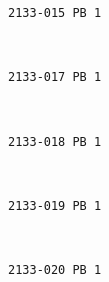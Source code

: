 \documentclass[11pt]{article}
\begin{document}
    \begin{Verbatim}[commandchars=\\\{\}]
2133-015 PB 1

    \end{Verbatim}

    \begin{center}
    \end{center}
    { \hspace*{\fill} \\}
    
    \begin{Verbatim}[commandchars=\\\{\}]
2133-017 PB 1

    \end{Verbatim}

    \begin{center}
    \end{center}
    { \hspace*{\fill} \\}
    
    \begin{Verbatim}[commandchars=\\\{\}]
2133-018 PB 1

    \end{Verbatim}

    \begin{center}
    \end{center}
    { \hspace*{\fill} \\}
    
    \begin{Verbatim}[commandchars=\\\{\}]
2133-019 PB 1

    \end{Verbatim}

    \begin{center}
    \end{center}
    { \hspace*{\fill} \\}
    
    \begin{Verbatim}[commandchars=\\\{\}]
2133-020 PB 1

    \end{Verbatim}
\end{document}
